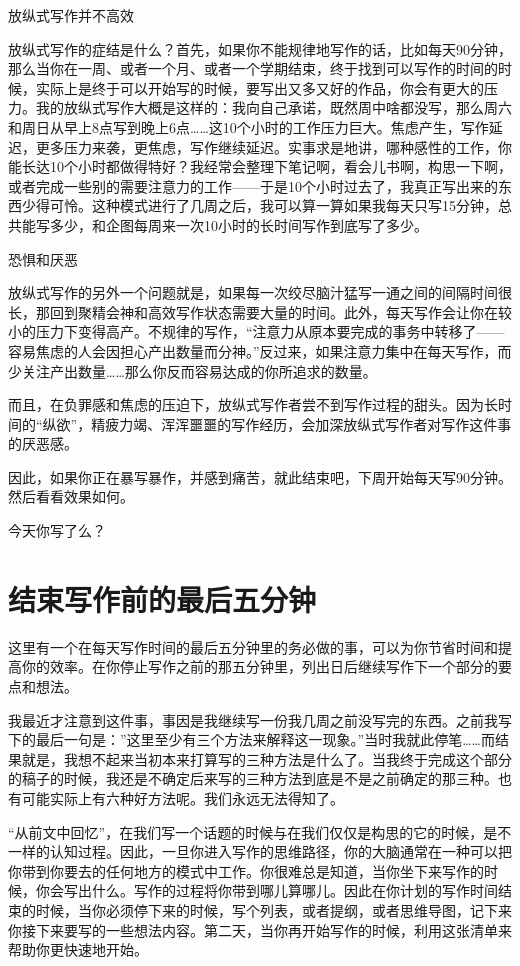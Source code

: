 \documentclass{ctexart}
\begin{document}
放纵式写作并不高效

放纵式写作的症结是什么？首先，如果你不能规律地写作的话，比如每天90分钟，那么当你在一周、或者一个月、或者一个学期结束，终于找到可以写作的时间的时候，实际上是终于可以开始写的时候，要写出又多又好的作品，你会有更大的压力。我的放纵式写作大概是这样的：我向自己承诺，既然周中啥都没写，那么周六和周日从早上8点写到晚上6点……这10个小时的工作压力巨大。焦虑产生，写作延迟，更多压力来袭，更焦虑，写作继续延迟。实事求是地讲，哪种感性的工作，你能长达10个小时都做得特好？我经常会整理下笔记啊，看会儿书啊，构思一下啊，或者完成一些别的需要注意力的工作——于是10个小时过去了，我真正写出来的东西少得可怜。这种模式进行了几周之后，我可以算一算如果我每天只写15分钟，总共能写多少，和企图每周来一次10小时的长时间写作到底写了多少。

恐惧和厌恶

放纵式写作的另外一个问题就是，如果每一次绞尽脑汁猛写一通之间的间隔时间很长，那回到聚精会神和高效写作状态需要大量的时间。此外，每天写作会让你在较小的压力下变得高产。不规律的写作，“注意力从原本要完成的事务中转移了——容易焦虑的人会因担心产出数量而分神。”反过来，如果注意力集中在每天写作，而少关注产出数量……那么你反而容易达成的你所追求的数量。

而且，在负罪感和焦虑的压迫下，放纵式写作者尝不到写作过程的甜头。因为长时间的“纵欲”，精疲力竭、浑浑噩噩的写作经历，会加深放纵式写作者对写作这件事的厌恶感。

因此，如果你正在暴写暴作，并感到痛苦，就此结束吧，下周开始每天写90分钟。然后看看效果如何。

今天你写了么？

\section{结束写作前的最后五分钟}

这里有一个在每天写作时间的最后五分钟里的务必做的事，可以为你节省时间和提高你的效率。在你停止写作之前的那五分钟里，列出日后继续写作下一个部分的要点和想法。

我最近才注意到这件事，事因是我继续写一份我几周之前没写完的东西。之前我写下的最后一句是：”这里至少有三个方法来解释这一现象。”当时我就此停笔……而结果就是，我想不起来当初本来打算写的三种方法是什么了。当我终于完成这个部分的稿子的时候，我还是不确定后来写的三种方法到底是不是之前确定的那三种。也有可能实际上有六种好方法呢。我们永远无法得知了。

“从前文中回忆”，在我们写一个话题的时候与在我们仅仅是构思的它的时候，是不一样的认知过程。因此，一旦你进入写作的思维路径，你的大脑通常在一种可以把你带到你要去的任何地方的模式中工作。你很难总是知道，当你坐下来写作的时候，你会写出什么。写作的过程将你带到哪儿算哪儿。因此在你计划的写作时间结束的时候，当你必须停下来的时候，写个列表，或者提纲，或者思维导图，记下来你接下来要写的一些想法内容。第二天，当你再开始写作的时候，利用这张清单来帮助你更快速地开始。
\end{document}
